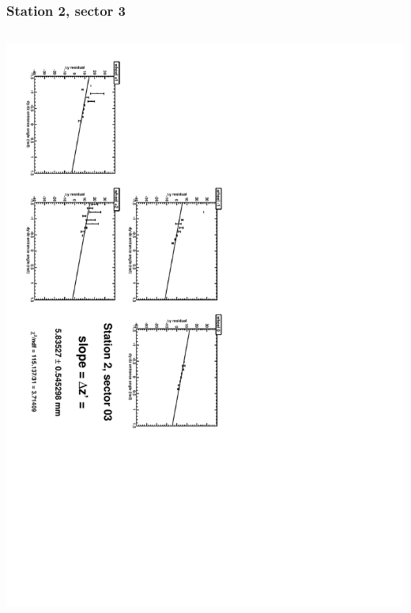 \documentclass[compress]{beamer}
\begin{document}
\begin{frame}
\frametitle{Station 2, sector 3}
\begin{columns}
\includegraphics[height=\linewidth, angle=90]{zfits/zfit_2_03.pdf}


\end{columns}
\end{frame}
\end{document}
